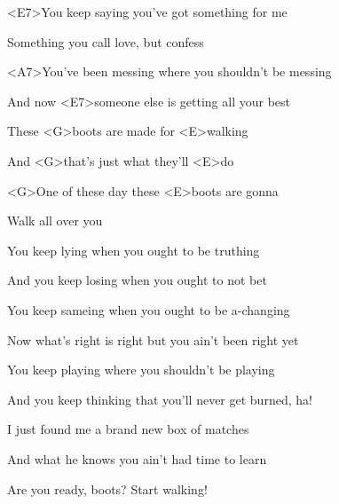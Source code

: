 

\zs
<E7>You keep saying you've got something for me

Something you call love, but confess

<A7>You've been messing where you shouldn't be messing

And now <E7>someone else is getting all your best
\ks

\zr
These <G>boots are made for <E>walking

And <G>that's just what they'll <E>do

<G>One of these day these <E>boots are gonna

Walk all over you
\kr

\zs
You keep lying when you ought to be truthing

And you keep losing when you ought to not bet

You keep sameing when you ought to be a-changing

Now what's right is right but you ain't been right yet
\ks

\zr\kr

\zs
You keep playing where you shouldn't be playing

And you keep thinking that you'll never get burned, ha!

I just found me a brand new box of matches

And what he knows you ain't had time to learn
\ks

\zr\kr

Are you ready, boots? Start walking!

\kp
